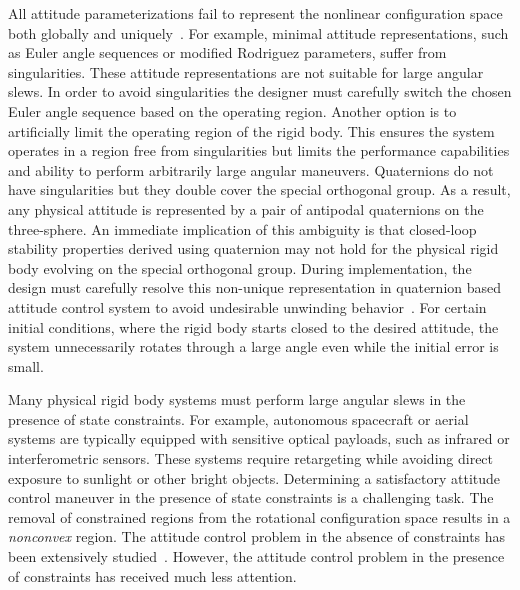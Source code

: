 \documentclass[letterpaper, 10 pt, conference]{ieeeconf}  %
\begin{document}
All attitude parameterizations fail to represent the nonlinear configuration space both globally and uniquely~\cite{chaturvedi2011a}.
For example, minimal attitude representations, such as Euler angle sequences or modified Rodriguez parameters, suffer from singularities.
These attitude representations are not suitable for large angular slews.
In order to avoid singularities the designer must carefully switch the chosen Euler angle sequence based on the operating region.
Another option is to artificially limit the operating region of the rigid body.
This ensures the system operates in a region free from singularities but limits the performance capabilities and ability to perform arbitrarily large angular maneuvers.
Quaternions do not have singularities but they double cover the special orthogonal group.
As a result, any physical attitude is represented by a pair of antipodal quaternions on the three-sphere.
An immediate implication of this ambiguity is that closed-loop stability properties derived using quaternion may not hold for the physical rigid body evolving on the special orthogonal group.
During implementation, the design must carefully resolve this non-unique representation in quaternion based attitude control system to avoid undesirable unwinding behavior~\cite{bhat2000}.
For certain initial conditions, where the rigid body starts closed to the desired attitude, the system unnecessarily rotates through a large angle even while the initial error is small.

Many physical rigid body systems must perform large angular slews in the presence of state constraints.
For example, autonomous spacecraft or aerial systems are typically equipped with sensitive optical payloads, such as infrared or interferometric sensors.
These systems require retargeting while avoiding direct exposure to sunlight or other bright objects.
Determining a satisfactory attitude control maneuver in the presence of state constraints is a challenging task.
The removal of constrained regions from the rotational configuration space results in a \textit{nonconvex} region.
The attitude control problem in the absence of constraints has been extensively studied~\cite{sanyal2008,lee2010,lee2011a}.
However, the attitude control problem in the presence of constraints has received much less attention.
\end{document}
